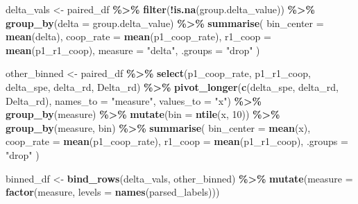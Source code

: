 \documentclass[
]{article}
\newenvironment{Shaded}{\begin{snugshade}}{\end{snugshade}}
\newcommand{\AttributeTok}[1]{\textcolor[rgb]{0.13,0.29,0.53}{#1}}
\newcommand{\DecValTok}[1]{\textcolor[rgb]{0.00,0.00,0.81}{#1}}
\newcommand{\FunctionTok}[1]{\textcolor[rgb]{0.13,0.29,0.53}{\textbf{#1}}}
\newcommand{\NormalTok}[1]{#1}
\newcommand{\OtherTok}[1]{\textcolor[rgb]{0.56,0.35,0.01}{#1}}
\newcommand{\SpecialCharTok}[1]{\textcolor[rgb]{0.81,0.36,0.00}{\textbf{#1}}}
\newcommand{\StringTok}[1]{\textcolor[rgb]{0.31,0.60,0.02}{#1}}
\begin{document}
\begin{Shaded}
\begin{Highlighting}[]
\NormalTok{delta\_vals }\OtherTok{\textless{}{-}}\NormalTok{ paired\_df }\SpecialCharTok{\%\textgreater{}\%}
  \FunctionTok{filter}\NormalTok{(}\SpecialCharTok{!}\FunctionTok{is.na}\NormalTok{(group.delta\_value)) }\SpecialCharTok{\%\textgreater{}\%}
  \FunctionTok{group\_by}\NormalTok{(}\AttributeTok{delta =}\NormalTok{ group.delta\_value) }\SpecialCharTok{\%\textgreater{}\%}
  \FunctionTok{summarise}\NormalTok{(}
    \AttributeTok{bin\_center =} \FunctionTok{mean}\NormalTok{(delta),}
    \AttributeTok{coop\_rate  =} \FunctionTok{mean}\NormalTok{(p1\_coop\_rate),}
    \AttributeTok{r1\_coop    =} \FunctionTok{mean}\NormalTok{(p1\_r1\_coop),}
    \AttributeTok{measure =} \StringTok{"delta"}\NormalTok{,}
    \AttributeTok{.groups =} \StringTok{"drop"}
\NormalTok{  )}

\NormalTok{other\_binned }\OtherTok{\textless{}{-}}\NormalTok{ paired\_df }\SpecialCharTok{\%\textgreater{}\%}
  \FunctionTok{select}\NormalTok{(p1\_coop\_rate, p1\_r1\_coop, delta\_spe, delta\_rd, Delta\_rd) }\SpecialCharTok{\%\textgreater{}\%}
  \FunctionTok{pivot\_longer}\NormalTok{(}\FunctionTok{c}\NormalTok{(delta\_spe, delta\_rd, Delta\_rd), }\AttributeTok{names\_to =} \StringTok{"measure"}\NormalTok{, }\AttributeTok{values\_to =} \StringTok{"x"}\NormalTok{) }\SpecialCharTok{\%\textgreater{}\%}
  \FunctionTok{group\_by}\NormalTok{(measure) }\SpecialCharTok{\%\textgreater{}\%}
  \FunctionTok{mutate}\NormalTok{(}\AttributeTok{bin =} \FunctionTok{ntile}\NormalTok{(x, }\DecValTok{10}\NormalTok{)) }\SpecialCharTok{\%\textgreater{}\%}
  \FunctionTok{group\_by}\NormalTok{(measure, bin) }\SpecialCharTok{\%\textgreater{}\%}
  \FunctionTok{summarise}\NormalTok{(}
    \AttributeTok{bin\_center =} \FunctionTok{mean}\NormalTok{(x),}
    \AttributeTok{coop\_rate  =} \FunctionTok{mean}\NormalTok{(p1\_coop\_rate),}
    \AttributeTok{r1\_coop    =} \FunctionTok{mean}\NormalTok{(p1\_r1\_coop),}
    \AttributeTok{.groups =} \StringTok{"drop"}
\NormalTok{  )}

\NormalTok{binned\_df }\OtherTok{\textless{}{-}} \FunctionTok{bind\_rows}\NormalTok{(delta\_vals, other\_binned) }\SpecialCharTok{\%\textgreater{}\%}
  \FunctionTok{mutate}\NormalTok{(}\AttributeTok{measure =} \FunctionTok{factor}\NormalTok{(measure, }\AttributeTok{levels =} \FunctionTok{names}\NormalTok{(parsed\_labels)))}
\end{Highlighting}
\end{Shaded}
\end{document}
